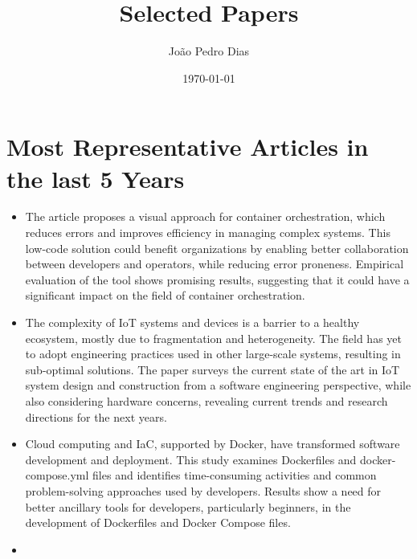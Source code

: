 \documentclass[11pt]{article}
\title{Selected Papers}
\author{João Pedro Dias}
\date{\today}
\begin{document}
\maketitle	
\thispagestyle{empty}
\pagebreak



\section{Most Representative Articles in the last 5 Years}
\begin{itemize}
    \item {}

    The article proposes a visual approach for container orchestration, which reduces errors and improves efficiency in managing complex systems. This low-code solution could benefit organizations by enabling better collaboration between developers and operators, while reducing error proneness. Empirical evaluation of the tool shows promising results, suggesting that it could have a significant impact on the field of container orchestration.
    
	\item {}
 
     The complexity of IoT systems and devices is a barrier to a healthy ecosystem, mostly due to fragmentation and heterogeneity. The field has yet to adopt engineering practices used in other large-scale systems, resulting in sub-optimal solutions. The paper surveys the current state of the art in IoT system design and construction from a software engineering perspective, while also considering hardware concerns, revealing current trends and research directions for the next years.
    
	\item {}
 
     Cloud computing and IaC, supported by Docker, have transformed software development and deployment. This study examines Dockerfiles and docker-compose.yml files and identifies time-consuming activities and common problem-solving approaches used by developers. Results show a need for better ancillary tools for developers, particularly beginners, in the development of Dockerfiles and Docker Compose files.


	\item {}


\end{itemize}
\end{document}
